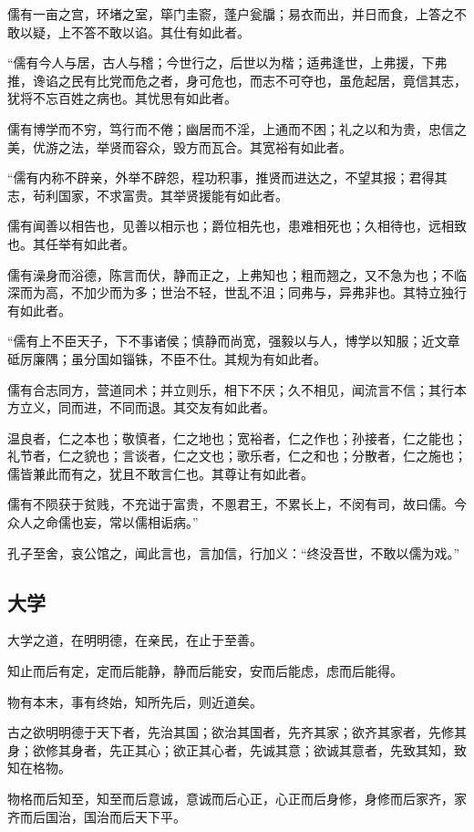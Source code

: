 \documentclass[]{article}
\begin{document}
儒有一亩之宫，环堵之室，筚门圭窬，蓬户瓮牖；易衣而出，并日而食，上答之不敢以疑，上不答不敢以谄。其仕有如此者。

``儒有今人与居，古人与稽；今世行之，后世以为楷；适弗逢世，上弗援，下弗推，谗谄之民有比党而危之者，身可危也，而志不可夺也，虽危起居，竟信其志，犹将不忘百姓之病也。其忧思有如此者。

儒有博学而不穷，笃行而不倦；幽居而不淫，上通而不困；礼之以和为贵，忠信之美，优游之法，举贤而容众，毁方而瓦合。其宽裕有如此者。

``儒有内称不辟亲，外举不辟怨，程功积事，推贤而进达之，不望其报；君得其志，茍利国家，不求富贵。其举贤援能有如此者。

儒有闻善以相告也，见善以相示也；爵位相先也，患难相死也；久相待也，远相致也。其任举有如此者。

儒有澡身而浴德，陈言而伏，静而正之，上弗知也；粗而翘之，又不急为也；不临深而为高，不加少而为多；世治不轻，世乱不沮；同弗与，异弗非也。其特立独行有如此者。

``儒有上不臣天子，下不事诸侯；慎静而尚宽，强毅以与人，博学以知服；近文章砥厉廉隅；虽分国如锱铢，不臣不仕。其规为有如此者。

儒有合志同方，营道同术；并立则乐，相下不厌；久不相见，闻流言不信；其行本方立义，同而进，不同而退。其交友有如此者。

温良者，仁之本也；敬慎者，仁之地也；宽裕者，仁之作也；孙接者，仁之能也；礼节者，仁之貌也；言谈者，仁之文也；歌乐者，仁之和也；分散者，仁之施也；儒皆兼此而有之，犹且不敢言仁也。其尊让有如此者。

儒有不陨获于贫贱，不充诎于富贵，不慁君王，不累长上，不闵有司，故曰儒。今众人之命儒也妄，常以儒相诟病。''

孔子至舍，哀公馆之，闻此言也，言加信，行加义：``终没吾世，不敢以儒为戏。''

\hypertarget{header-n866}{%
\subsection{大学}\label{header-n866}}

大学之道，在明明德，在亲民，在止于至善。

知止而后有定，定而后能静，静而后能安，安而后能虑，虑而后能得。

物有本末，事有终始，知所先后，则近道矣。

古之欲明明德于天下者，先治其国；欲治其国者，先齐其家；欲齐其家者，先修其身；欲修其身者，先正其心；欲正其心者，先诚其意；欲诚其意者，先致其知，致知在格物。

物格而后知至，知至而后意诚，意诚而后心正，心正而后身修，身修而后家齐，家齐而后国治，国治而后天下平。
\end{document}
